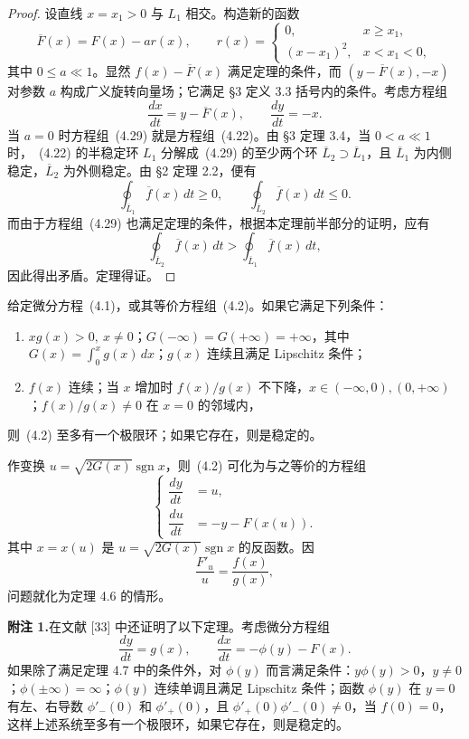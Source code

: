 \begin{proof}
设直线 $x=x_1>0$ 与 $L_1$ 相交。构造新的函数
\[
\overline{F}(x)=F(x)-ar(x),\qquad
r(x)=\begin{cases}
0,&x\geq x_1,\\
(x-x_1)^2,&x<x_1<0,
\end{cases}
\]
其中 $0\leq a\ll1$。显然 $f(x)-\overline{F}(x)$ 满足定理的条件，而 $(y-\overline{F}(x),-x)$ 对参数 $a$ 构成广义旋转向量场；它满足 \S3 定义 3.3 括号内的条件。考虑方程组
\[
\dfrac{dx}{dt}=y-\overline{F}(x),\qquad \dfrac{dy}{dt}=-x. \tag{4.29}
\]
当 $a=0$ 时方程组~(4.29) 就是方程组~(4.22)。由 \S3 定理 3.4，当 $0<a\ll1$ 时，~(4.22) 的半稳定环 $L_1$ 分解成~(4.29) 的至少两个环 $\overline L_2\supset\overline L_1$，且 $\overline L_1$ 为内侧稳定，$\overline L_2$ 为外侧稳定。由 \S2 定理 2.2，便有
\[
\oint_{\overline L_1}\overline f(x)\,dt\geq0,\qquad
\oint_{\overline L_2}\overline f(x)\,dt\leq0.
\]
而由于方程组~(4.29) 也满足定理的条件，根据本定理前半部分的证明，应有
\[
\oint_{\overline L_2}\overline f(x)\,dt>
\oint_{\overline L_1}\overline f(x)\,dt,
\]
因此得出矛盾。定理得证。
\end{proof}

\begin{theorem}{}{ }
给定微分方程~(4.1)，或其等价方程组~(4.2)。如果它满足下列条件：
\begin{enumerate}
\item $xg(x)>0,\ x\ne0$；$G(-\infty)=G(+\infty)=+\infty$，其中 $G(x)=\displaystyle\int_0^xg(x)\,dx$；$g(x)$ 连续且满足 Lipschitz 条件；
\item $f(x)$ 连续；当 $x$ 增加时 $f(x)/g(x)$ 不下降，$x\in(-\infty,0),(0,+\infty)$；$f(x)/g(x)\ne0$ 在 $x=0$ 的邻域内，
\end{enumerate}
则~(4.2) 至多有一个极限环；如果它存在，则是稳定的。
\end{theorem}

作变换 $u=\sqrt{2G(x)}\operatorname{sgn}x$，则~(4.2) 可化为与之等价的方程组
\[
\left\{
\begin{aligned}
\dfrac{dy}{dt}&=u,\\
\dfrac{du}{dt}&=-y-F(x(u)).
\end{aligned}\right.
\]
其中 $x=x(u)$ 是 $u=\sqrt{2G(x)}\operatorname{sgn}x$ 的反函数。因
\[
\dfrac{F'_u}{u}=\dfrac{f(x)}{g(x)},
\]
问题就化为定理 4.6 的情形。

\textbf{附注 1.}\quad 在文献 [33] 中还证明了以下定理。考虑微分方程组
\[
\dfrac{dy}{dt}=g(x),\qquad \dfrac{dx}{dt}=-\phi(y)-F(x).
\]
如果除了满足定理 4.7 中的条件外，对 $\phi(y)$ 而言满足条件：$y\phi(y)>0$，$y\ne0$；$\phi(\pm\infty)=\infty$；$\phi(y)$ 连续单调且满足 Lipschitz 条件；函数 $\phi(y)$ 在 $y=0$ 有左、右导数 $\phi'_-(0)$ 和 $\phi'_+(0)$，且 $\phi'_+(0)\phi'_-(0)\ne0$，当 $f(0)=0$，这样上述系统至多有一个极限环，如果它存在，则是稳定的。

